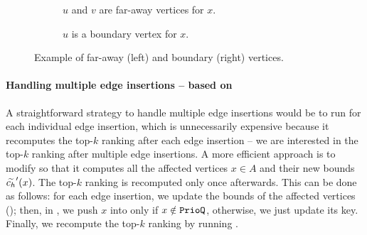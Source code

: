 \begin{figure}[tb]
\centering
\begin{subfigure}[t]{.45\textwidth}
\centering

\caption{$u$ and $v$ are far-away vertices for $x$.}
\label{fig:far-away-vertex}
\end{subfigure}
%
\begin{subfigure}[t]{.45\textwidth}
\centering

\caption{$u$ is a boundary vertex for $x$.}
\label{fig:boundary-vertex}
\end{subfigure}
\caption{Example of far-away (left) and boundary (right) vertices.}
\label{fig:far-away-boundary}
\end{figure}

\paragraph{Handling multiple edge insertions -- based on \nbcut}
%
A straightforward strategy to handle multiple edge insertions would be to run
 for each individual edge insertion, which is
unnecessarily expensive because it recomputes the top-$k$ ranking after each
edge insertion -- we are interested in the top-$k$ ranking after multiple edge
insertions. A more efficient approach is to modify  so
that it computes all the affected vertices $x \in A$ and their new bounds
$\widetilde{c_h}'(x)$. The top-$k$ ranking is recomputed only once afterwards.
This can be done as follows: for each edge insertion, we update the bounds
of the affected vertices
(); then, in
, we push $x$ into \prioq only if
$x\notin\texttt{PrioQ}$, otherwise, we just update its key. Finally, we recompute the
top-$k$ ranking by running
.

